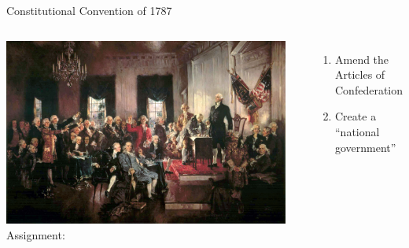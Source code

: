 \begin{frame}{Constitutional Convention of 1787}
    \begin{columns}[onlytextwidth]
            \centering
            \includegraphics[width=0.95\textwidth]{img/constitutional-convention.jpg} \\

            Assignment:
            \begin{enumerate}
                \item Amend the Articles of Confederation
                \item Create a “national government”
            \end{enumerate}
    \end{columns}
\end{frame}


